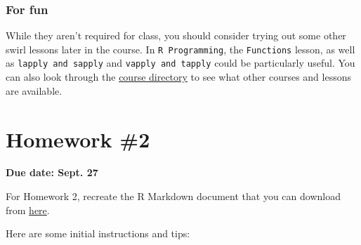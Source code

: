 \documentclass[]{book}
\theoremstyle{definition}
\theoremstyle{definition}
\theoremstyle{definition}
\theoremstyle{remark}
\begin{document}
\subsubsection{For fun}\label{for-fun}

While they aren't required for class, you should consider trying out
some other swirl lessons later in the course. In
\texttt{R\ Programming}, the \texttt{Functions} lesson, as well as
\texttt{lapply\ and\ sapply} and \texttt{vapply\ and\ tapply} could be
particularly useful. You can also look through the
\href{http://swirlstats.com/scn/title.html}{course directory} to see
what other courses and lessons are available.

\section{Homework \#2}\label{homework-2}

\textbf{Due date: Sept. 27}

For Homework 2, recreate the R Markdown document that you can download
from
\href{https://github.com/geanders/RProgrammingForResearch/raw/master/Homework/Homework_2.docx}{here}.

Here are some initial instructions and tips:
\end{document}
